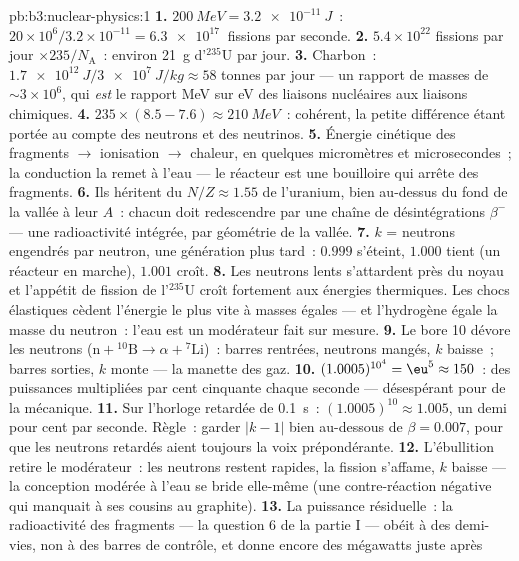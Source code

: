 \begin{solution}{pb:b3:nuclear-physics:1}
\textbf{1.} $\qty{200}{MeV} = \qty{3.2e-11}{J}$~:
$20\times10^6/3.2\times10^{-11} = \qty{6.3e17}{}$ fissions par
seconde.
\textbf{2.} $5.4\times10^{22}$ fissions par jour $\times
235/N_{\text{A}}$~: environ \qty{21}{g} d'$^{235}$U par jour.
\textbf{3.} Charbon~: $\qty{1.7e12}{J}/\qty{3e7}{J/kg} \approx 58$
tonnes par jour --- un rapport de masses de $\sim3\times10^{6}$, qui
\emph{est} le rapport \unit{MeV} sur \unit{eV} des liaisons
nucléaires aux liaisons chimiques.
\textbf{4.} $235\times(8.5 - 7.6) \approx \qty{210}{MeV}$~:
cohérent, la petite différence étant portée au compte des neutrons et
des neutrinos.
\textbf{5.} Énergie cinétique des fragments $\to$ ionisation $\to$
chaleur, en quelques micromètres et microsecondes~; la conduction la
remet à l'eau --- le réacteur est une bouilloire qui arrête des
fragments.
\textbf{6.} Ils héritent du $N/Z \approx 1.55$ de l'uranium, bien
au-dessus du fond de la vallée à leur $A$~: chacun doit redescendre
par une chaîne de désintégrations $\beta^-$ --- une radioactivité
intégrée, par géométrie de la vallée.
\textbf{7.} $k$ = neutrons engendrés par neutron, une génération plus
tard~: $0.999$ s'éteint, $1.000$ tient (un réacteur en marche),
$1.001$ croît.
\textbf{8.} Les neutrons lents s'attardent près du noyau et l'appétit
de fission de l'$^{235}$U croît fortement aux énergies thermiques.
Les chocs élastiques cèdent l'énergie le plus vite à masses égales
--- et l'hydrogène égale la masse du neutron~: l'eau est un
modérateur fait sur mesure.
\textbf{9.} Le bore 10 dévore les neutrons ($\text{n} + {}^{10}
\text{B} \to \alpha + {}^{7}\text{Li}$)~: barres rentrées, neutrons
mangés, $k$ baisse~; barres sorties, $k$ monte --- la manette des
gaz.
\textbf{10.} $(1.0005)^{10^4} = \eu^{5} \approx 150$~: des puissances
multipliées par cent cinquante chaque seconde --- désespérant pour
de la mécanique.
\textbf{11.} Sur l'horloge retardée de \qty{0.1}{s}~:
$(1.0005)^{10} \approx 1.005$, un demi pour cent par seconde. Règle~:
garder $|k - 1|$ bien au-dessous de $\beta = 0.007$, pour que les
neutrons retardés aient toujours la voix prépondérante.
\textbf{12.} L'ébullition retire le modérateur~: les neutrons restent
rapides, la fission s'affame, $k$ baisse --- la conception modérée à
l'eau se bride elle-même (une contre-réaction négative qui manquait à
ses cousins au graphite).
\textbf{13.} La puissance résiduelle~: la radioactivité des fragments
--- la question 6 de la partie I --- obéit à des demi-vies, non à des
barres de contrôle, et donne encore des mégawatts juste après

\end{solution}
